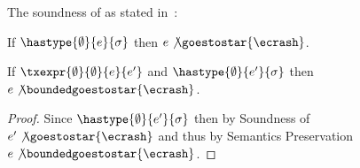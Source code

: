 The soundness of \corelan as stated in~\cite{vazou13}:  

\begin{theorem*}
\label{theorem:core} %
If   $\hastype{\emptyset}{e}{\sigma}$ 
then $e \not \goestostar{\ecrash}$.
\end{theorem*}

\begin{theorem*}[Soundness]
\label{theorem:bounded}
If $\txexpr{\emptyset}{\emptyset}{e}{e'}$ and
   $\hastype{\emptyset}{e'}{\sigma}$ 
then $e \not \boundedgoestostar{\ecrash}$.
\end{theorem*}
\begin{proof}
Since $\hastype{\emptyset}{e'}{\sigma}$ then by Soundness of \corelan
$e' \not \goestostar{\ecrash}$ and thus by Semantics Preservation $e \not \boundedgoestostar{\ecrash}$. 
\end{proof}